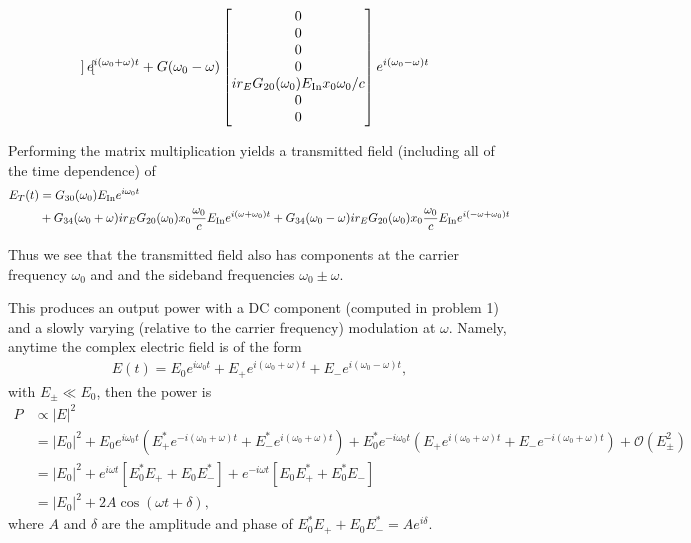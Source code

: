 \documentclass[11pt]{article}
\begin{document}
\begin{enumerate}
\begin{itemize}
\begin{align}
\begin{bmatrix}
\end{bmatrix}
e^{i(\omega_0+\omega)t}
+G(\omega_0 -\omega)
\begin{bmatrix}
0 \\ 0 \\ 0 \\0 \\ ir_EG_{20}(\omega_0)E_{\rm In}x_0\omega_0/c \\ 0 \\0
\end{bmatrix}
e^{i(\omega_0-\omega)t}
\end{align}

Performing the matrix multiplication yields a transmitted field (including all of the time dependence) of
\begin{align}
E_T(t)&=G_{30}(\omega_0)E_{\rm In}e^{i\omega_0 t} \nonumber \\
&+G_{34}(\omega_0+\omega)ir_EG_{20}(\omega_0)x_0\frac{\omega_0}{c}E_{\rm In}e^{i(\omega+\omega_0)t}
+G_{34}(\omega_0-\omega)ir_EG_{20}(\omega_0)x_0\frac{\omega_0}{c}E_{\rm In}e^{i(-\omega+\omega_0)t} \label{eq:ETmod}
\end{align}

Thus we see that the transmitted field also has components at the carrier frequency $\omega_0$ and and the sideband frequencies $\omega_0\pm \omega$.

This produces an output power with a DC component  (computed in problem 1) and a slowly varying (relative to the carrier frequency) modulation at $\omega$. Namely, anytime the complex electric field is of the form
\begin{align}
E(t)=E_0e^{i\omega_0 t}+E_+e^{i(\omega_0+\omega)t}+E_-e^{i(\omega_0-\omega)t},
\end{align}
with $E_\pm\ll E_0$, then
the power is
\begin{align}
P&\propto |E|^2 \nonumber \\
&=|E_0|^2+E_0 e^{i\omega_0 t}(E_+^*e^{-i(\omega_0+\omega)t}+E_-^*e^{i(\omega_0+\omega)t}) +E_0^* e^{-i\omega_0 t}(E_+e^{i(\omega_0+\omega)t}+E_-e^{-i(\omega_0+\omega)t}) +\mathcal{O}(E_\pm^2) \nonumber \\
&=|E_0|^2+e^{i\omega t}\left[E_0^*E_++E_0E_-^*\right]+e^{-i\omega t}\left[E_0E_+^*+E_0^*E_-\right] \nonumber \\
&=|E_0|^2 +2A\cos(\omega t+\delta),
\end{align}
where $A$ and $\delta$ are the amplitude and phase of $E_0^*E_++E_0E_-^*=Ae^{i\delta}$.


\end{itemize}
\end{enumerate}
\end{document}
